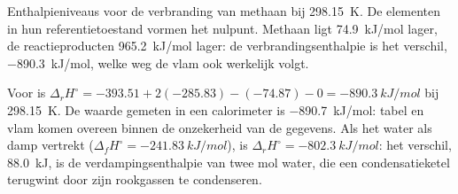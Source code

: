 \begin{omfigure}

{\small Enthalpieniveaus voor de verbranding van methaan bij \qty{298.15}{K}.
De elementen in hun referentietoestand vormen het nulpunt. Methaan ligt
\qty{74.9}{kJ/mol} lager, de reactieproducten \qty{965.2}{kJ/mol} lager:
de verbrandingsenthalpie is het verschil, \qty{-890.3}{kJ/mol}, welke
weg de vlam ook werkelijk volgt.}
\end{omfigure}

\begin{example}\label{ex:b2:reaction-enthalpy:methane}
Voor  is
$\Delta_r H^\circ = -393.51 + 2(-285.83) - (-74.87) - 0 =
\qty{-890.3}{kJ/mol}$ bij \qty{298.15}{K}. De waarde gemeten in een
calorimeter is \qty{-890.7}{kJ/mol}: tabel en vlam komen overeen binnen
de onzekerheid van de gegevens. Als het water als damp vertrekt
($\Delta_f H^\circ = \qty{-241.83}{kJ/mol}$), is $\Delta_r H^\circ =
\qty{-802.3}{kJ/mol}$: het verschil, \qty{88.0}{kJ}, is de verdampingsenthalpie
van twee mol water, die een condensatieketel terugwint door
zijn rookgassen te condenseren.
\end{example}

